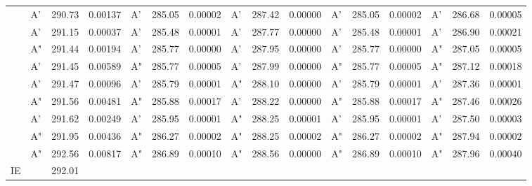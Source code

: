 \documentclass[journal=jctcce,manuscript=article]{achemso}
\begin{document}
\begin{table}
\begin{tabular}{l|lcc|lcc|lcc|lcc|lcc}
& A' & 290.73 & 0.00137 & A' & 285.05 & 0.00002 & A' & 287.42 & 0.00000 & A' & 285.05 & 0.00002 & A' & 286.68 & 0.00005 \\
& A' & 291.15 & 0.00037 & A' & 285.48 & 0.00001 & A' & 287.77 & 0.00000 & A' & 285.48 & 0.00001 & A' & 286.90 & 0.00021 \\
& A" & 291.44 & 0.00194 & A' & 285.77 & 0.00000 & A' & 287.95 & 0.00000 & A' & 285.77 & 0.00000 & A" & 287.05 & 0.00005 \\
& A' & 291.45 & 0.00589 & A" & 285.77 & 0.00005 & A' & 287.99 & 0.00000 & A" & 285.77 & 0.00005 & A" & 287.12 & 0.00018 \\
& A' & 291.47 & 0.00096 & A' & 285.79 & 0.00001 & A" & 288.10 & 0.00000 & A' & 285.79 & 0.00001 & A' & 287.36 & 0.00001 \\
& A" & 291.56 & 0.00481 & A" & 285.88 & 0.00017 & A' & 288.22 & 0.00000 & A" & 285.88 & 0.00017 & A" & 287.46 & 0.00026 \\
& A' & 291.62 & 0.00249 & A' & 285.95 & 0.00001 & A" & 288.25 & 0.00001 & A' & 285.95 & 0.00001 & A' & 287.50 & 0.00003 \\
& A" & 291.95 & 0.00436 & A" & 286.27 & 0.00002 & A" & 288.25 & 0.00002 & A" & 286.27 & 0.00002 & A" & 287.94 & 0.00002 \\
& A" & 292.56 & 0.00817 & A" & 286.89 & 0.00010 & A" & 288.56 & 0.00000 & A" & 286.89 & 0.00010 & A" & 287.96 & 0.00040 \\

\hline
IE & & 292.01  \\
\hline
  \end{tabular}
\end{table}
\end{document}

